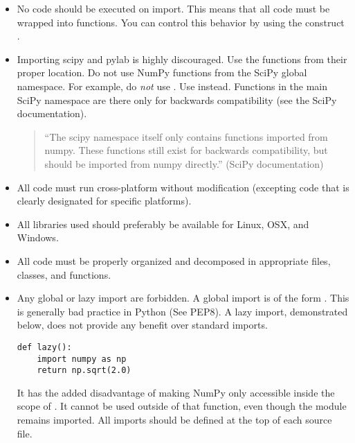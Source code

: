 \begin{itemize}
\item No code should be executed on import.
This means that all code must be wrapped into functions.
You can control this behavior by using the construct .
\item Importing scipy and pylab is highly discouraged.
Use the functions from their proper location.
Do not use NumPy functions from the SciPy global namespace.
For example, do \emph{not} use .  Use  instead.
Functions in the main SciPy namespace are there only for backwards compatibility (see the SciPy documentation).
\begin{quote}
``The scipy namespace itself only contains functions imported from numpy.
These functions still exist for backwards compatibility, but should be imported from numpy directly.'' (SciPy documentation)
\end{quote}
\item All code must run cross-platform without modification (excepting code that is clearly designated for specific platforms).
\item All libraries used should preferably be available for Linux, OSX, and Windows.
\item All code must be properly organized and decomposed in appropriate files, classes, and functions.
\item Any global or lazy import are forbidden.
A global import is of the form .
This is generally bad practice in Python (See PEP8).
A lazy import, demonstrated below, does not provide any benefit over standard imports.
\begin{lstlisting}
def lazy():
    import numpy as np
    return np.sqrt(2.0)
\end{lstlisting}
It has the added disadvantage of making NumPy only accessible inside the scope of .
It cannot be used outside of that function, even though the module remains imported.
All imports should be defined at the top of each source file.
\end{itemize}

